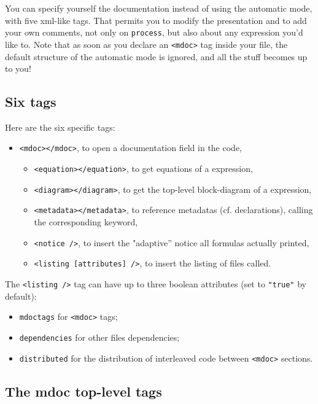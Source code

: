\documentclass[a4paper,10pt]{book}
\begin{document}
You can specify yourself the documentation instead of using the automatic mode, with five xml-like tags. That permits you to modify the presentation and to add your own comments, not only on \lstinline!process!, but also about any expression you'd like to. Note that as soon as you declare an \lstinline!<mdoc>! tag inside your \faust file, the default structure of the automatic mode is ignored, and all the \latex stuff becomes up to you!

\subsection{Six tags}
\label{sec:doc-tags}

Here are the six specific tags:
\begin{itemize}
\item \lstinline!<mdoc></mdoc>!, to open a documentation field in the \faust code,
  \begin{itemize}
  \item \lstinline!<equation></equation>!, to get equations of a \faust expression,
  \item \lstinline!<diagram></diagram>!, to get the top-level block-diagram of a \faust expression,
  \item \lstinline!<metadata></metadata>!, to reference \faust metadatas (cf. declarations), calling the corresponding keyword,
  \item \lstinline!<notice />!, to insert the "adaptive'' notice all formulas actually printed,
  \item \lstinline!<listing [attributes] />!, to insert the listing of \faust files called.
  \end{itemize}
\end{itemize}

The \lstinline!<listing />! tag can have up to three boolean attributes (set to \lstinline!"true"! by default):
\begin{itemize}
\item \lstinline'mdoctags' for \lstinline'<mdoc>' tags;
\item \lstinline'dependencies' for other files dependencies;
\item \lstinline'distributed' for the distribution of interleaved \faust code between \lstinline'<mdoc>' sections.
\end{itemize}


\subsection{The mdoc top-level tags}
\label{sec:mdoc-tag}
\end{document}
